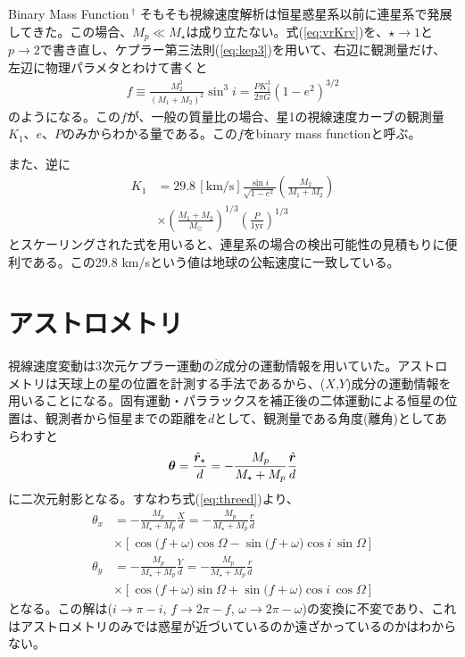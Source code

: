 \begin{itembox}{Binary Mass Function$\,^\dagger$}
\footnotesize
\color{gray}
そもそも視線速度解析は恒星惑星系以前に連星系で発展してきた。この場合、$M_p \ll M_\star$は成り立たない。式(\ref{eq:vrKrv})を、$\star \to 1$と$p \to 2$で書き直し、ケプラー第三法則(\ref{eq:kep3})を用いて、右辺に観測量だけ、左辺に物理パラメタとわけて書くと
\begin{align}
  \label{eq:bmfunc}
  f \equiv \frac{M_2^3}{(M_1 + M_2)^2} \sin^3{i} = \frac{P K_1^3}{2 \pi G} (1 - e^2)^{3/2}
\end{align}
のようになる。この$f$が、一般の質量比の場合、星1の視線速度カーブの観測量$K_1$、$e$、$P$のみからわかる量である。この$f$をbinary mass functionと呼ぶ。

また、逆に
\begin{align}
  \label{eq:semiamp2}
  K_1 &= 29.8 \, [\mathrm{km/s}]  \frac{\sin{i}}{\sqrt{1 - e^2}} \left( \frac{M_2}{M_1 + M_2} \right) \nonumber \\
  &\times \left( \frac{M_1 + M_2}{M_\odot} \right)^{1/3} \left( \frac{P}{1 \mathrm{yr}} \right)^{1/3}
\end{align}
とスケーリングされた式を用いると、連星系の場合の検出可能性の見積もりに便利である。この29.8 km/sという値は地球の公転速度に一致している。

\end{itembox}

\section{アストロメトリ}
視線速度変動は3次元ケプラー運動の$\dot{Z}$成分の運動情報を用いていた。アストロメトリは天球上の星の位置を計測する手法であるから、($X$,$Y$)成分の運動情報を用いることになる。固有運動・パララックスを補正後の二体運動による恒星の位置は、観測者から恒星までの距離を$d$として、観測量である角度(離角)としてあらわすと
\begin{align}
   {\boldsymbol{\theta}} = \frac{\hat{\boldsymbol{r}}_\star}{d} = - \frac{M_p}{M_\star + M_p} \frac{\hat{\boldsymbol{r}}}{d}
\end{align}
に二次元射影となる。すなわち式(\ref{eq:threed})より、
\begin{align}
    \theta_x &= - \frac{M_p}{M_\star + M_p} \frac{X}{d} = - \frac{M_p}{M_\star + M_p} \frac{r}{d} \nonumber\\
    &\times [\cos\!\bigl(f+\omega\bigr)\cos\Omega
 - \sin\!\bigl(f+\omega\bigr)\cos i\,\sin\Omega]\\
     \theta_y &= - \frac{M_p}{M_\star + M_p} \frac{Y}{d} =- \frac{M_p}{M_\star + M_p}\frac{r}{d} \nonumber\\
     &\times [ \cos\!\bigl(f+\omega\bigr)\sin\Omega
 + \sin\!\bigl(f+\omega\bigr)\cos i\,\cos\Omega]
\end{align}
となる。この解は($i \to \pi - i$, $f \to 2 \pi - f$, $\omega \to 2 \pi - \omega$)の変換に不変であり、これはアストロメトリのみでは惑星が近づいているのか遠ざかっているのかはわからない。
